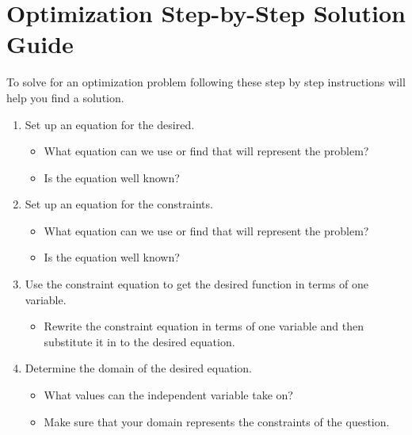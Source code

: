 \documentclass[12pt]{article}
\begin{document}
\noindent\makebox[\linewidth]{\rule{\paperwidth}{0.4pt}}

  \section{Optimization Step-by-Step Solution Guide}
  To solve for an optimization problem following these step by step instructions will help you find a solution.
    \begin{enumerate}
      \item Set up an equation for the desired.
      \begin{itemize}
        \item What equation can we use or find that will represent the problem?
        \item Is the equation well known?
      \end{itemize}

      \item Set up an equation for the constraints.
      \begin{itemize}
        \item What equation can we use or find that will represent the problem?
        \item Is the equation well known?
      \end{itemize}

      \item Use the constraint equation to get the desired function in terms of one variable.
      \begin{itemize}
        \item Rewrite the constraint equation in terms of one variable and then substitute it in to the desired equation.
      \end{itemize}
\newpage
      \item Determine the domain of the desired equation.
      \begin{itemize}
        \item What values can the independent variable take on?
        \item Make sure that your domain represents the constraints of the question.
      \end{itemize}


\end{enumerate}
\end{document}
